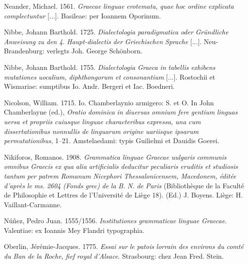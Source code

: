 \documentclass[output=paper]{langsci/langscibook}
\begin{document}
Neander, Michael. 1561. \textit{Graecae} \textit{linguae} \textit{erotemata,} \textit{quae} \textit{hoc} \textit{ordine} \textit{explicata} \textit{complectuntur} [...]. Basileae: per Ioannem Oporinum.

Nibbe, Johann Barthold. 1725. \textit{Dialectologia} \textit{paradigmatica} \textit{oder} \textit{Gründliche} \textit{Anweisung} \textit{zu} \textit{den} \textit{4.} \textit{Haupt-dialectis} \textit{der} \textit{Griechischen} \textit{Sprache} [...]. Neu-Brandenburg: verlegts Joh. George Schönborn.

Nibbe, Johann Barthold. 1755. \textit{Dialectologia} \textit{Graeca} \textit{in} \textit{tabellis} \textit{exhibens} \textit{mutationes} \textit{uocalium,} \textit{diphthongorum} \textit{et} \textit{consonantium} [...]. Rostochii et Wismariae: sumptibus Io. Andr. Bergeri et Iac. Boedneri.

Nicolson, William. 1715. Io. Chamberlaynio armigero: S. et O. In John Chamberlayne (ed.), \textit{Oratio} \textit{dominica} \textit{in} \textit{diuersas} \textit{omnium} \textit{fere} \textit{gentium} \textit{linguas} \textit{uersa} \textit{et} \textit{propriis} \textit{cuiusque} \textit{linguae} \textit{characteribus} \textit{expressa,} \textit{una} \textit{cum} \textit{dissertationibus} \textit{nonnullis} \textit{de} \textit{linguarum} \textit{origine} \textit{uariisque} \textit{ipsarum} \textit{permutationibus}, 1–21. Amstelaedami: typis Guilielmi et Dauidis Goerei.

Nikiforos, Romanos. 1908. \textit{Grammatica} \textit{linguae} \textit{Graecae} \textit{uulgaris} \textit{communis} \textit{omnibus} \textit{Graecis} \textit{ex} \textit{qua} \textit{alia} \textit{artificialis} \textit{deducitur} \textit{peculiaris} \textit{eruditis} \textit{et} \textit{studiosis} \textit{tantum} \textit{per} \textit{patrem} \textit{Romanum} \textit{Nicephori} \textit{Thessalonicensem,} \textit{Macedonem,} \textit{éditée} \textit{d’après} \textit{le} \textit{ms.} \textit{2604} \textit{(Fonds} \textit{grec)} \textit{de} \textit{la} \textit{B.} \textit{N.} \textit{de} \textit{Paris} (Bibliothèque de la Faculté de Philosophie et Lettres de l’Université de Liège 18). (Ed.) J. Boyens. Liège: H. Vaillant-Carmanne.

Núñez, Pedro Juan. 1555/1556. \textit{Institutiones} \textit{grammaticae} \textit{linguae} \textit{Graecae}. Valentiae: ex Ioannis Mey Flandri typographia.

Oberlin, Jérémie-Jacques. 1775. \textit{Essai} \textit{sur} \textit{le} \textit{patois} \textit{lorrain} \textit{des} \textit{environs} \textit{du} \textit{comté} \textit{du} \textit{Ban} \textit{de} \textit{la} \textit{Roche,} \textit{fief} \textit{royal} \textit{d’Alsace}. Strasbourg: chez Jean Fred. Stein.
\end{document}
